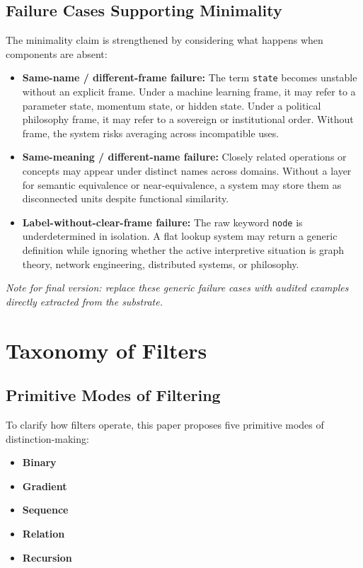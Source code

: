 \documentclass[11pt,a4paper]{article}
\begin{document}
\subsection{Failure Cases Supporting Minimality}

The minimality claim is strengthened by considering what happens when components are absent:
\begin{itemize}[leftmargin=2em]
    \item \textbf{Same-name / different-frame failure:} The term \texttt{state} becomes unstable without an explicit frame. Under a machine learning frame, it may refer to a parameter state, momentum state, or hidden state. Under a political philosophy frame, it may refer to a sovereign or institutional order. Without frame, the system risks averaging across incompatible uses.
    \item \textbf{Same-meaning / different-name failure:} Closely related operations or concepts may appear under distinct names across domains. Without a layer for semantic equivalence or near-equivalence, a system may store them as disconnected units despite functional similarity.
    \item \textbf{Label-without-clear-frame failure:} The raw keyword \texttt{node} is underdetermined in isolation. A flat lookup system may return a generic definition while ignoring whether the active interpretive situation is graph theory, network engineering, distributed systems, or philosophy.
\end{itemize}

\textit{Note for final version: replace these generic failure cases with audited examples directly extracted from the substrate.}

\section{Taxonomy of Filters}

\subsection{Primitive Modes of Filtering}

To clarify how filters operate, this paper proposes five primitive modes of distinction-making:
\begin{itemize}[leftmargin=2em]
    \item \textbf{Binary}
    \item \textbf{Gradient}
    \item \textbf{Sequence}
    \item \textbf{Relation}
    \item \textbf{Recursion}
\end{itemize}
\end{document}
